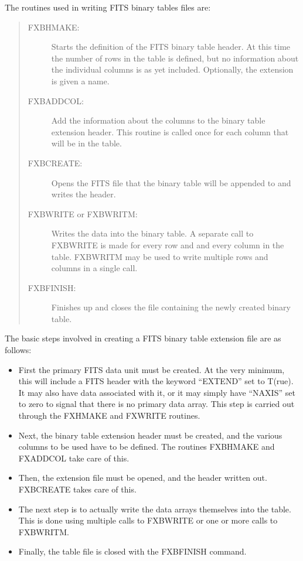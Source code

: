 The routines used in writing FITS binary tables files are:
\begin{quote}
\begin{description}
\item[FXBHMAKE:]
Starts the definition of the FITS binary table header.  At this time the number
of rows in the table is defined, but no information about the individual
columns is as yet included.  Optionally, the extension is given a name.
\item[FXBADDCOL:]
Add the information about the columns to the binary table extension header.
This routine is called once for each column that will be in the table.
\item[FXBCREATE:]
Opens the FITS file that the binary table will be appended to and writes the
header.
\item[FXBWRITE or FXBWRITM:]
Writes the data into the binary table.  A separate call to FXBWRITE is
made for every row and and every column in the table.  FXBWRITM may be
used to write multiple rows and columns in a single call.
\item[FXBFINISH:]
Finishes up and closes the file containing the newly created binary table.
\end{description}
\end{quote}

The basic steps involved in creating a FITS binary table extension file are as
follows:
%
\begin{itemize}
\item
	First the primary FITS data unit must be created.  At the very minimum,
	this will include a FITS header with the keyword ``EXTEND'' set to
	T(rue).  It may also have data associated with it, or it may simply
	have ``NAXIS'' set to zero to signal that there is no primary data
	array.  This step is carried out through the FXHMAKE and FXWRITE
	routines.
\item
	Next, the binary table extension header must be created, and the
	various columns to be used have to be defined.  The routines FXBHMAKE
	and FXADDCOL take care of this.
\item
	Then, the extension file must be opened, and the header written out.
	FXBCREATE takes care of this.
\item
	The next step is to actually write the data arrays themselves into the
	table.  This is done using multiple calls to FXBWRITE or one or more
	calls to FXBWRITM.
\item
	Finally, the table file is closed with the FXBFINISH command.
\end{itemize}

